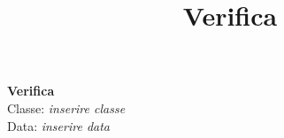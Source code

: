 \documentclass[11pt,a4paper]{article}
\title{Verifica}
\author{}
\date{}
\begin{document}
\begin{center}
  {\Large \textbf{Verifica}}\\
  Classe: \textit{inserire classe}\\
  Data: \textit{inserire data}
\end{center}



\end{document}
